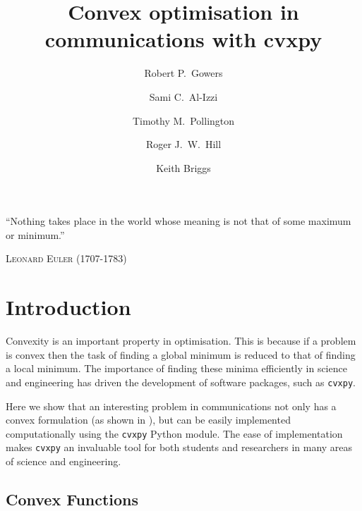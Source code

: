 \documentclass[twocolumn,secnumarabic,amssymb, nobibnotes, aps, prl,superscriptaddress]{revtex4-1}
\newcommand{\NewsItem}[1]{%
		\large #1 \vspace{4pt}
		\par \normalsize \normalfont}
\newcommand{\NewsAuthor}[1]{%
			\hfill \textsc{#1} \vspace{4pt}
			\par \normalfont}
\begin{document}

\title{Convex optimisation in communications with cvxpy}

\author{Robert P.~Gowers}%
\author{Sami C.~Al-Izzi}%
\author{Timothy M.~Pollington}%
\author{Roger J.~W.~Hill}%
\author{Keith Briggs}

\maketitle

	\NewsItem{``Nothing takes place in the world whose meaning is not that of some maximum or minimum.''}
	\NewsAuthor{Leonard Euler (1707-1783)}
    
\section{Introduction}
Convexity is an important property in optimisation. This is because if a problem is convex then the task of finding a global minimum is reduced to that of finding a local minimum. The importance of finding these minima efficiently in science and engineering has driven the development of software packages, such as \texttt{cvxpy}.

Here we show that an interesting problem in communications not only has a convex formulation (as shown in \cite{cvxpybook}), but can be easily implemented computationally using the \texttt{cvxpy} Python module. The ease of implementation makes \texttt{cvxpy} an invaluable tool for both students and researchers in many areas of science and engineering.
\subsection{Convex Functions}

\end{document}
